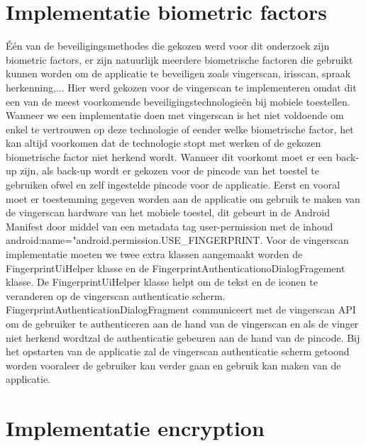 \section{Implementatie biometric factors}

Één van de beveiligingsmethodes die gekozen werd voor dit onderzoek zijn biometric factors, er zijn natuurlijk meerdere biometrische factoren die gebruikt kunnen worden om de applicatie te beveiligen zoals vingerscan, irisscan, spraak herkenning,... Hier werd gekozen voor de vingerscan te implementeren omdat dit een van de meest voorkomende beveiligingstechnologieën bij mobiele toestellen. Wanneer we een implementatie doen met vingerscan is het niet voldoende om enkel te vertrouwen op deze technologie of eender welke biometrische factor, het kan altijd voorkomen dat de technologie stopt met werken of de gekozen biometrische factor niet herkend wordt. Wanneer dit voorkomt moet er een back-up zijn, als back-up wordt er gekozen voor de pincode van het toestel te gebruiken ofwel en zelf ingestelde pincode voor de applicatie. Eerst en vooral moet er toestemming gegeven worden aan de applicatie om gebruik te maken van de vingerscan hardware van het mobiele toestel, dit gebeurt in de Android Manifest door middel van een metadata tag user-permission met de inhoud android:name="android.permission.USE\_FINGERPRINT. Voor de vingerscan implementatie moeten we twee extra klassen aangemaakt worden de FingerprintUiHelper klasse en de FingerprintAuthenticationoDialogFragement klasse. De FingerprintUiHelper klasse helpt om de tekst en de iconen te veranderen op de vingerscan authenticatie scherm. FingerprintAuthenticationDialogFragment communiceert met de vingerscan API om de gebruiker te authenticeren aan de hand van de vingerscan en als de vinger niet herkend wordtzal de authenticatie gebeuren aan de hand van de pincode. Bij het opstarten van de applicatie zal de vingerscan authenticatie scherm getoond worden vooraleer de gebruiker kan verder gaan en gebruik kan maken van de applicatie. 

\section{Implementatie encryption}

